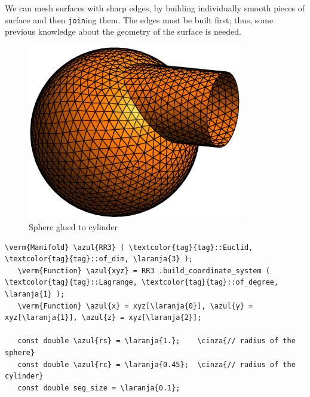 We can mesh surfaces with sharp edges, by building individually smooth pieces of surface
and then {\small\tt join}ing them.
The edges must be built first;
thus, some previous knowledge about the geometry of the surface is needed.

\begin{figure}[ht] \centering
 \includegraphics[width=94mm]{sphere-cyl}
  \caption{Sphere glued to cylinder}
  \label{\numb section 3.\numb fig 6}
\end{figure}

\begin{Verbatim}[commandchars=\\\{\},formatcom=\small\tt,frame=single,
   label=parag-\ref{\numb section 3.\numb parag 19}.cpp,rulecolor=\color{moldura},
   baselinestretch=0.94,framesep=2mm                                              ]
   \verm{Manifold} \azul{RR3} ( \textcolor{tag}{tag}::Euclid, \textcolor{tag}{tag}::of_dim, \laranja{3} );
   \verm{Function} \azul{xyz} = RR3 .build_coordinate_system ( \textcolor{tag}{tag}::Lagrange, \textcolor{tag}{tag}::of_degree, \laranja{1} );
   \verm{Function} \azul{x} = xyz[\laranja{0}], \azul{y} = xyz[\laranja{1}], \azul{z} = xyz[\laranja{2}];

   const double \azul{rs} = \laranja{1.};    \cinza{// radius of the sphere}
   const double \azul{rc} = \laranja{0.45};  \cinza{// radius of the cylinder}
   const double seg_size = \laranja{0.1};
\end{Verbatim}


